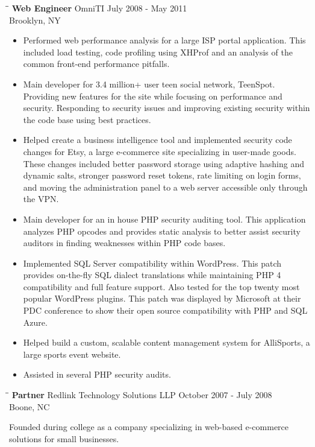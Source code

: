 \documentclass{res}
\begin{document}
\begin{resume}
   \begin{tabbing}%
   \hspace{2.3in}\= \hspace{2.6in}\= \kill %
   {\bf Web Engineer}  \>OmniTI \> July 2008 - May 2011\\
                          \>Brooklyn, NY
   \end{tabbing}\vspace{-5pt}
   \begin{itemize}
    \item Performed web performance analysis for a large ISP portal application. This included load testing, code profiling using XHProf and an analysis of the common front-end performance pitfalls.
    \item Main developer for 3.4 million+ user teen social network, TeenSpot. Providing new features for the site while focusing on performance and security. Responding to security issues and improving existing security within the code base using best practices.
    \item Helped create a business intelligence tool and implemented security code changes for Etsy, a large e-commerce site specializing in user-made goods. These changes included better password storage using adaptive hashing and dynamic salts, stronger password reset tokens, rate limiting on login forms, and moving the administration panel to a web server accessible only through the VPN.
    \item Main developer for an in house PHP security auditing tool. This application analyzes PHP opcodes and provides static analysis to better assist security auditors in finding weaknesses within PHP code bases.
    \item Implemented SQL Server compatibility within WordPress. This patch provides on-the-fly SQL dialect translations while maintaining PHP 4 compatibility and full feature support. Also tested for the top twenty most popular WordPress plugins. This patch was displayed by Microsoft at their PDC conference to show their open source compatibility with PHP and SQL Azure.
    \item Helped build a custom, scalable content management system for AlliSports, a large sports event website.
    \item Assisted in several PHP security audits.
    \end{itemize}

    \begin{tabbing}%
   \hspace{2.3in}\= \hspace{2.6in}\= \kill %
   {\bf Partner}  \>Redlink Technology Solutions LLP \> October 2007 - July 2008\\
                          \>Boone, NC
   \end{tabbing}\vspace{-10pt}
    Founded during college as a company specializing in web-based e-commerce solutions for small businesses.


\end{resume}
\end{document}
